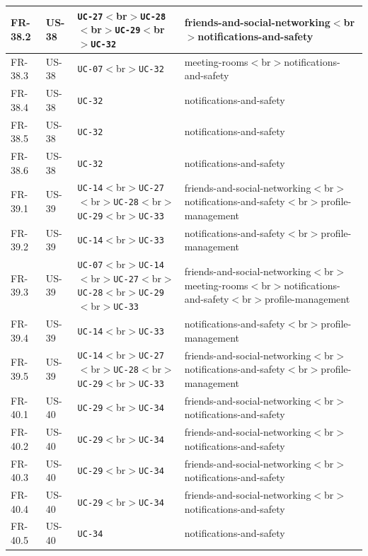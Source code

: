 \documentclass[12pt]{article}
\begin{document}
\begin{longtable}{|>{\raggedright\arraybackslash}p{}|>{\raggedright\arraybackslash}p{}|>{\raggedright\arraybackslash}p{}|>{\raggedright\arraybackslash}p{}|}
FR-38.2 & US-38 & \texttt{UC-27}$<$br$>$\texttt{UC-28}$<$br$>$\texttt{UC-29}$<$br$>$\texttt{UC-32} & friends-and-social-networking$<$br$>$notifications-and-safety \\ \hline
FR-38.3 & US-38 & \texttt{UC-07}$<$br$>$\texttt{UC-32} & meeting-rooms$<$br$>$notifications-and-safety \\ \hline
FR-38.4 & US-38 & \texttt{UC-32} & notifications-and-safety \\ \hline
FR-38.5 & US-38 & \texttt{UC-32} & notifications-and-safety \\ \hline
FR-38.6 & US-38 & \texttt{UC-32} & notifications-and-safety \\ \hline
FR-39.1 & US-39 & \texttt{UC-14}$<$br$>$\texttt{UC-27}$<$br$>$\texttt{UC-28}$<$br$>$\texttt{UC-29}$<$br$>$\texttt{UC-33} & friends-and-social-networking$<$br$>$notifications-and-safety$<$br$>$profile-management \\ \hline
FR-39.2 & US-39 & \texttt{UC-14}$<$br$>$\texttt{UC-33} & notifications-and-safety$<$br$>$profile-management \\ \hline
FR-39.3 & US-39 & \texttt{UC-07}$<$br$>$\texttt{UC-14}$<$br$>$\texttt{UC-27}$<$br$>$\texttt{UC-28}$<$br$>$\texttt{UC-29}$<$br$>$\texttt{UC-33} & friends-and-social-networking$<$br$>$meeting-rooms$<$br$>$notifications-and-safety$<$br$>$profile-management \\ \hline
FR-39.4 & US-39 & \texttt{UC-14}$<$br$>$\texttt{UC-33} & notifications-and-safety$<$br$>$profile-management \\ \hline
FR-39.5 & US-39 & \texttt{UC-14}$<$br$>$\texttt{UC-27}$<$br$>$\texttt{UC-28}$<$br$>$\texttt{UC-29}$<$br$>$\texttt{UC-33} & friends-and-social-networking$<$br$>$notifications-and-safety$<$br$>$profile-management \\ \hline
FR-40.1 & US-40 & \texttt{UC-29}$<$br$>$\texttt{UC-34} & friends-and-social-networking$<$br$>$notifications-and-safety \\ \hline
FR-40.2 & US-40 & \texttt{UC-29}$<$br$>$\texttt{UC-34} & friends-and-social-networking$<$br$>$notifications-and-safety \\ \hline
FR-40.3 & US-40 & \texttt{UC-29}$<$br$>$\texttt{UC-34} & friends-and-social-networking$<$br$>$notifications-and-safety \\ \hline
FR-40.4 & US-40 & \texttt{UC-29}$<$br$>$\texttt{UC-34} & friends-and-social-networking$<$br$>$notifications-and-safety \\ \hline
FR-40.5 & US-40 & \texttt{UC-34} & notifications-and-safety \\ \hline
\end{longtable}
\endgroup
\par\medskip
\end{document}
